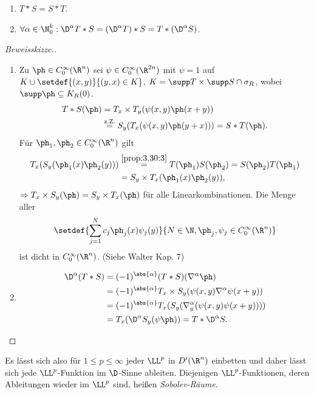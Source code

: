 \begin{prop}[Eigenschaften]
\label{prop:3.40}
\begin{enumerate}[label=\arabic{*}.)]
  \item $T*S = S*T$.
  \item $\forall\alpha\in\N_0^k : \D^\alpha T*S = (\D^\alpha T)*S =
  T*(\D^\alpha S)$.\fishhere
\end{enumerate}
\end{prop}
\begin{proof}[Beweisskizze.]
\begin{enumerate}[label=\arabic{*}.)]
  \item Zu $\ph\in C_0^\infty(\R^n)$ sei $\psi\in C_0^\infty(\R^{2n})$ mit
  $\psi=1$ auf $K\cup \setdef{(x,y)}{(y,x)\in K}$, $K=\supp T\times \supp S\cap
  \sigma_R$, wobei $\supp \ph \subseteq K_R(0)$.
\begin{align*}
T*S(\ph) &= T_x\times T_y(\psi(x,y)\ph(x+y)) \\ &\overset{\text{z.Z.}}{=}
S_y(T_x(\psi(x,y)\ph(y+x))) = S*T(\ph).
\end{align*}
Für $\ph_1,\ph_2\in C_0^\infty(\R^n)$ gilt
\begin{align*}
T_x(S_y(\ph_1(x)\ph_2(y))) &\overset{\ref{prop:3.30:3}}{=} T(\ph_1)S(\ph_2) =
S(\ph_2)T(\ph_1) \\ &= S_y\times T_x(\ph_1(x)\ph_2(y)),
\end{align*}
$\Rightarrow T_x\times S_y(\ph) = S_y\times T_x(\ph)$
für alle Linearkombinationen. Die Menge aller
\begin{align*}
\setdef{\sum\limits_{j=1}^N c_j \ph_j(x) \psi_j(y)}{N\in\N, \ph_j,\psi_j\in
C_0^\infty(\R^n)}
\end{align*}
ist dicht in $C_0^\infty(\R^n)$. (Siehe Walter Kap. 7)
\item
\begin{align*}
\D^\alpha (T*S) &= (-1)^{\abs{\alpha}}(T*S)(\nabla^\alpha \ph) \\ &=
(-1)^{\abs{\alpha}} T_x\times S_y(\psi(x,y)\nabla^\alpha\psi(x+y)) \\ &=
(-1)^{\abs{\alpha}} T_x(S_y(\nabla_y^\alpha(\psi(x,y)\psi(x+y)))) \\ &=
T_x(\D^\alpha S_y(\psi\ph)) = T*\D^\alpha S.\qedhere
\end{align*}
\end{enumerate}
\end{proof}

Es lässt sich also für $1\le p\le \infty$ jeder $\LL^p$ in
$D'(\R^n)$ einbetten und daher lässt sich jede $\LL^p$-Funktion im $\D$-Sinne
ableiten. Diejenigen $\LL^p$-Funktionen, deren Ableitungen wieder im $\LL^p$
sind, heißen \emph{Sobolev-Räume}.
